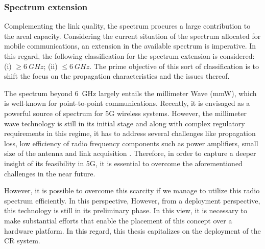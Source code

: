 \subsubsection*{Spectrum extension}
Complementing the link quality, the spectrum procures a large contribution to the areal capacity. Considering the current situation of the spectrum allocated for mobile communications, an extension in the available spectrum is imperative. In this regard, the following classification for the spectrum extension is considered:
(i) $\ge \SI{6}{GHz}$;
(ii) $\le \SI{6}{GHz}$.
The prime objective of this sort of classification is to shift the focus on the propagation characteristics and the issues thereof.


The spectrum beyond \SI{6}{GHz} largely entails the millimeter Wave (mmW), which is well-known for point-to-point communications. Recently, it is envisaged as a powerful source of spectrum for 5G wireless systems. However, the millimeter wave technology is still in its initial stage and along with complex regulatory requirements in this regime, it has to address several challenges like propagation loss, low efficiency of radio frequency components such as power amplifiers, small size of the antenna and link acquisition \cite{Rapp13}. Therefore, in order to capture a deeper insight of its feasibility in 5G, it is essential to overcome the aforementioned challenges in the near future.

 However, it is possible to overcome this scarcity if we manage to utilize this radio spectrum efficiently. In this perspective,  However, from a deployment perspective, this technology is still in its preliminary phase. In this view, it is necessary to make substantial efforts that enable the placement of this concept over a hardware platform. In this regard, this thesis capitalizes on the deployment of the CR system. 

